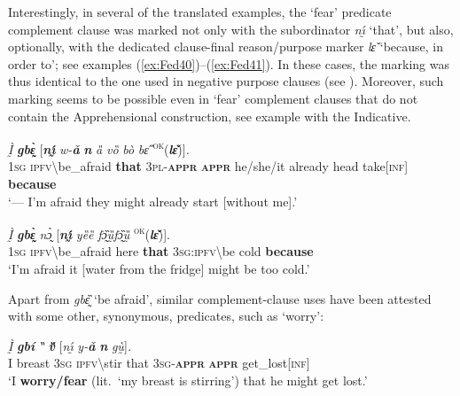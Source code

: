 \documentclass[output=paper,colorlinks,citecolor=brown
]{langscibook}
\begin{document}
 Interestingly, in several of the translated examples, the `fear' predicate complement clause was marked not only with the subordinator \textit{nı̰́} `that', but also, optionally, with the dedicated clause-final reason\slash purpose marker \textit{lɛ̌} `because, in order to'; see examples (\ref{ex:Fed40})--(\ref{ex:Fed41}). In these cases, the marking was thus identical to the one used in negative purpose clauses (see ). Moreover, such marking seems to be possible even in `fear' complement clauses that do not contain the Apprehensional construction, see example  with the Indicative.

\ea \label{ex:Fed41}
\gll \textit{Ḭ̀} \textit{\textbf{gbɛ̰̀}} \textup{[}\textit{\textbf{nı̰́}} \textit{w-\textbf{ǎ}} \textit{\textbf{n{\ù}}} \textit{ȁ} \textit{vȍ} \textit{bò} \textit{bɛ̋} \textsuperscript{\textsc{ok}}\textup{(}\textit{\textbf{lɛ̌}}\textup{)}\textup{]}\textit{.} \\
\textsc{1sg} \textsc{ipfv}\backslash be\_afraid \textbf{that} \textsc{3pl-\textbf{appr}} \textbf{\textsc{appr}} he/she/it already head take[\textsc{inf}] \textbf{because} \\
 `--- I'm afraid they might already start [without me].'
\z


\ea \label{ex:Fed42}
\gll \textit{Ḭ̀} \textit{\textbf{gbɛ̰̀}} \textit{nɔ̰̀} \textup{[}\textit{\textbf{nı̰́}} \textit{yȅȅ} \textit{fɔ̰̏ṵ̏fɔ̰̏ṵ̏} \textsuperscript{\textsc{ok}}\textup{(}\textit{\textbf{lɛ̌}}\textup{)}\textup{]}. \\
\textsc{1sg} \textsc{ipfv}\backslash be\_afraid here \textbf{that} \textsc{3sg:ipfv}\backslash be cold \textbf{because} \\
\glt `I'm afraid it [water from the fridge] might be too cold.'
\z

 Apart from \textit{gbɛ̰̏} `be afraid', similar complement-clause uses have been attested with some other, synonymous, predicates, such as `worry':

\ea \label{ex:Fed43}
\gll \textit{Ḭ̀} \textit{\textbf{gbí}} \textit{‶} \textit{\textbf{v{\ȕ}}} \textup{[}\textit{nı̰́} \textit{y-\textbf{ǎ}} \textit{\textbf{n{\ù}}} \textit{gṵ̀{\à}}\textup{]}\textit{.} \\
I breast \textsc{3sg} \textsc{ipfv}\backslash stir that \textsc{3sg-\textbf{appr}} \textbf{\textsc{appr}} get\_lost[\textsc{inf}] \\
\glt `I \textbf{worry\slash fear} (lit.\ `my breast is stirring') that he might get lost.'
\z
\end{document}
